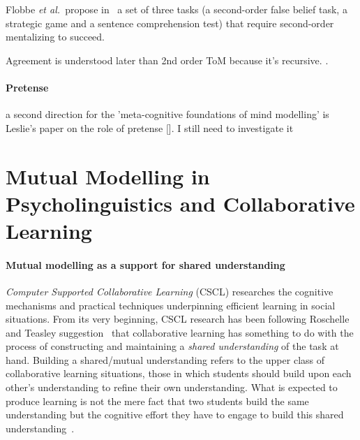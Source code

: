 \documentclass{sig-alternate}
\newcommand{\etal}{{\textit{et al.~}}}
\begin{document}
Flobbe \etal propose in~\cite{flobbe2008children} a set of three tasks (a
second-order false belief task, a strategic game and a sentence comprehension
test) that require second-order mentalizing to succeed.

Agreement is understood later than 2nd order ToM because it's recursive.
\cite[p.~664]{verbrugge2009logic}.

\paragraph{Pretense}

a second direction for the 'meta-cognitive foundations of mind modelling' is
Leslie's paper on the role of pretense []. I still need to investigate it




\section{Mutual Modelling in Psycholinguistics and Collaborative Learning}

\paragraph{Mutual modelling as a support for shared understanding}

\emph{Computer Supported Collaborative Learning} (CSCL) researches the cognitive
mechanisms and practical techniques underpinning efficient learning in social
situations. From its very beginning, CSCL research has been following
Roschelle and Teasley suggestion~\cite{roschelle1995construction} that
collaborative learning has something to do with the process of constructing and
maintaining a \emph{shared understanding} of the task at hand. Building a shared/mutual
understanding refers to the upper class of collaborative learning situations,
those in which students should build upon each other's understanding to refine
their own understanding.  What is expected to produce learning is not the mere
fact that two students build the same understanding but the cognitive effort
they have to engage to build this shared
understanding~\cite{schwartz1995emergence}.
\end{document}
